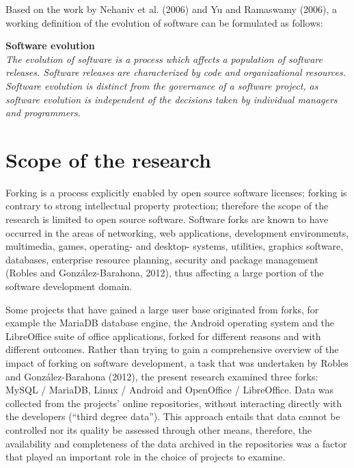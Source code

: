 \noindent
Based on the work by Nehaniv et al. (2006) and Yu and Ramaswamy (2006), a working definition of the evolution of software can be formulated as follows:

\begin{description}
\item{\textbf{Software evolution}} \hfill \\ \textit{The evolution of software is a process which affects a population of software releases. Software releases are characterized by code and organizational resources. Software evolution is distinct from the governance of a software project, as software evolution is independent of the decisions taken by individual managers and programmers.}
\end{description}



\section{Scope of the research}

Forking is a process explicitly enabled by open source software licenses; forking is contrary to strong intellectual property protection; therefore the scope of the research is limited to open source software. Software forks are known to have occurred in the areas of networking, web applications, development environments, multimedia, games, operating- and desktop- systems, utilities, graphics software, databases, enterprise resource planning, security and package management (Robles and González-Barahona, 2012), thus affecting a large portion of the software development domain.

Some projects that have gained a large user base originated from forks, for example the MariaDB database engine, the Android operating system and the LibreOffice suite of office applications, forked for different reasons and with different outcomes. Rather than trying to gain a comprehensive overview of the impact of forking on software development, a task that was undertaken by Robles and González-Barahona (2012), the present research examined three forks: MySQL / MariaDB, Linux / Android and OpenOffice / LibreOffice. Data was collected from the projects' online repositories, without interacting directly with the developers (“third degree data”). This approach entails that data cannot be controlled nor its quality be assessed through other means, therefore, the availability and completeness of the data archived in the repositories was a factor that played an important role in the choice of projects to examine.

